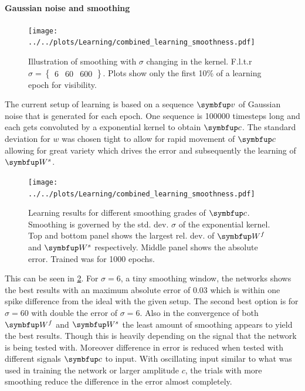 \paragraph{Gaussian noise and smoothing}
\begin{figure}
	\centering
	\texttt{[image: ../../plots/Learning/combined\_learning\_smoothness.pdf]}
	\caption{Illustration of smoothing with $\sigma$ changing in the kernel. F.l.t.r $\sigma = \begin{Bmatrix}
		6 & 60 & 600\end{Bmatrix}$. Plots show only the first 10\% of a learning epoch for visibility.}
	\label{fig:generate_input_seq}
\end{figure}
The current setup of learning is based on a sequence $\bmu{v}$ of Gaussian noise that is generated for each epoch. One sequence is 100000 timesteps long and each gets convoluted by a exponential kernel to obtain $\bmu{c}$. The standard deviation for $w$ was chosen tight to allow for rapid movement of $\bmu{c}$ allowing for great variety which drives the error and subsequently the learning of $\bmu{W}^s$.\\
\begin{figure}
	\centering
	\texttt{[image: ../../plots/Learning/combined\_learning\_smoothness.pdf]}
	\caption{Learning results for different smoothing grades of $\bmu{c}$. Smoothing is governed by the std. dev. $\sigma$ of the exponential kernel. Top and bottom panel shows the largest rel. dev. of $\bmu{W}^f$ and $\bmu{W}^s$ respectively. Middle panel shows the absolute error. Trained was for 1000 epochs.}
	\label{fig:combined_learning_smoothness}
\end{figure}
This can be seen in \cref{fig:combined_learning_smoothness}. For $\sigma = 6$, a tiny smoothing window, the networks shows the best results with an maximum absolute error of $0.03$ which is within one spike difference from the ideal with the given setup. The second best option is for $\sigma = 60$ with double the error of $\sigma = 6$. Also in the convergence of both $\bmu{W}^f$ and $\bmu{W}^s$ the least amount of smoothing appears to yield the best results. Though this is heavily depending on the signal that the network is being tested with.
Moreover difference in error is reduced when tested with different signals $\bmu{c}$ to input. With oscillating input similar to what was used in training the network or larger amplitude $c$, the trials with more smoothing reduce the difference in the error almost completely.\\
